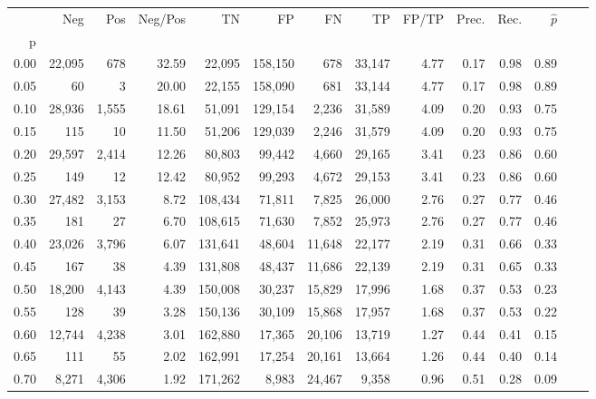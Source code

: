 \begin{tabular}{rrrrrrrrrrrrrr}
\toprule
{} &     Neg &    Pos & Neg/Pos &       TN &       FP &      FN &      TP & FP/TP & Prec. &  Rec. & $\hat{p}$ \\
p    &         &        &         &          &          &         &         &       &       &       &           \\
\midrule
0.00 &  22,095 &    678 &   32.59 &   22,095 &  158,150 &     678 &  33,147 &  4.77 &  0.17 &  0.98 &      0.89 \\
0.05 &      60 &      3 &   20.00 &   22,155 &  158,090 &     681 &  33,144 &  4.77 &  0.17 &  0.98 &      0.89 \\
0.10 &  28,936 &  1,555 &   18.61 &   51,091 &  129,154 &   2,236 &  31,589 &  4.09 &  0.20 &  0.93 &      0.75 \\
0.15 &     115 &     10 &   11.50 &   51,206 &  129,039 &   2,246 &  31,579 &  4.09 &  0.20 &  0.93 &      0.75 \\
0.20 &  29,597 &  2,414 &   12.26 &   80,803 &   99,442 &   4,660 &  29,165 &  3.41 &  0.23 &  0.86 &      0.60 \\
0.25 &     149 &     12 &   12.42 &   80,952 &   99,293 &   4,672 &  29,153 &  3.41 &  0.23 &  0.86 &      0.60 \\
0.30 &  27,482 &  3,153 &    8.72 &  108,434 &   71,811 &   7,825 &  26,000 &  2.76 &  0.27 &  0.77 &      0.46 \\
0.35 &     181 &     27 &    6.70 &  108,615 &   71,630 &   7,852 &  25,973 &  2.76 &  0.27 &  0.77 &      0.46 \\
0.40 &  23,026 &  3,796 &    6.07 &  131,641 &   48,604 &  11,648 &  22,177 &  2.19 &  0.31 &  0.66 &      0.33 \\
0.45 &     167 &     38 &    4.39 &  131,808 &   48,437 &  11,686 &  22,139 &  2.19 &  0.31 &  0.65 &      0.33 \\
0.50 &  18,200 &  4,143 &    4.39 &  150,008 &   30,237 &  15,829 &  17,996 &  1.68 &  0.37 &  0.53 &      0.23 \\
0.55 &     128 &     39 &    3.28 &  150,136 &   30,109 &  15,868 &  17,957 &  1.68 &  0.37 &  0.53 &      0.22 \\
0.60 &  12,744 &  4,238 &    3.01 &  162,880 &   17,365 &  20,106 &  13,719 &  1.27 &  0.44 &  0.41 &      0.15 \\
0.65 &     111 &     55 &    2.02 &  162,991 &   17,254 &  20,161 &  13,664 &  1.26 &  0.44 &  0.40 &      0.14 \\
0.70 &   8,271 &  4,306 &    1.92 &  171,262 &    8,983 &  24,467 &   9,358 &  0.96 &  0.51 &  0.28 &      0.09 \\

\end{tabular}
